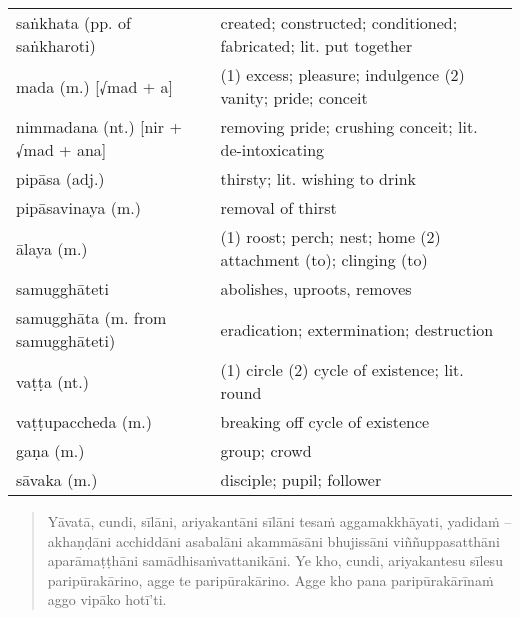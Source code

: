 \documentclass[11pt,oneside]{memoir}
\begin{document}
\begin{longtable}{L{\colOne} L{\colTwo}}
saṅkhata (pp. of saṅkharoti) & created; constructed; conditioned; fabricated; lit. put together\\[0pt]
mada (m.) [√mad + a] & (1) excess; pleasure; indulgence (2) vanity; pride; conceit\\[0pt]
nimmadana (nt.) [nir + √mad + ana] & removing pride; crushing conceit; lit. de-intoxicating\\[0pt]
pipāsa (adj.) & thirsty; lit. wishing to drink\\[0pt]
pipāsavinaya (m.) & removal of thirst\\[0pt]
ālaya (m.) & (1) roost; perch; nest; home (2) attachment (to); clinging (to)\\[0pt]
samugghāteti & abolishes, uproots, removes\\[0pt]
samugghāta (m. from samugghāteti) & eradication; extermination; destruction\\[0pt]
vaṭṭa (nt.) & (1) circle (2) cycle of existence; lit. round\\[0pt]
vaṭṭupaccheda (m.) & breaking off cycle of existence\\[0pt]
gaṇa (m.) & group; crowd\\[0pt]
sāvaka (m.) & disciple; pupil; follower\\[0pt]
\end{longtable}

\clearpage

\begin{quote}
Yāvatā, cundi, sīlāni, ariyakantāni sīlāni tesaṁ aggamakkhāyati, yadidaṁ --
akhaṇḍāni acchiddāni asabalāni akammāsāni bhujissāni viññuppasatthāni
aparāmaṭṭhāni samādhisaṁvattanikāni.
Ye kho, cundi, ariyakantesu sīlesu paripūrakārino, agge te paripūrakārino.
Agge kho pana paripūrakārīnaṁ aggo vipāko hotī'ti.
\end{quote}
\end{document}
